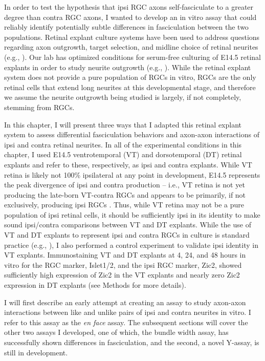 In order to test the hypothesis that ipsi RGC axons self-fasciculate to a greater degree than contra RGC axons, I wanted to develop an in vitro assay that could reliably identify potentially subtle differences in fasciculation between the two populations.
Retinal explant culture systems have been used to address questions regarding axon outgrowth, target selection, and midline choice of retinal neurites (e.g., ).
Our lab has optimized conditions for serum-free culturing of E14.5 retinal explants in order to study neurite outgrowth (e.g., ).
While the retinal explant system does not provide a pure population of RGCs in vitro, RGCs are the only retinal cells that extend long neurites at this developmental stage, and therefore we assume the neurite outgrowth being studied is largely, if not completely, stemming from RGCs.

In this chapter, I will present three ways that I adapted this retinal explant system to assess differential fasciculation behaviors and axon-axon interactions of ipsi and contra retinal neurites.
In all of the experimental conditions in this chapter, I used E14.5 ventrotemporal (VT) and dorsotemporal (DT) retinal explants and refer to these, respectively, as ipsi and contra explants.
While VT retina is likely not 100\% ipsilateral at any point in development, E14.5 represents the peak divergence of ipsi and contra production -- i.e., VT retina is not yet producing the late-born VT-contra RGCs and appears to be primarily, if not exclusively, producing ipsi RGCs \cite{drager1985birth}.
Thus, while VT retina may not be a pure population of ipsi retinal cells, it should be sufficiently ipsi in its identity to make sound ipsi/contra comparisons between VT and DT explants.
While the use of VT and DT explants to represent ipsi and contra RGCs in culture is standard practice (e.g., ), I also performed a control experiment to validate ipsi identity in VT explants.
Immunostaining VT and DT explants at 4, 24, and 48 hours in vitro for the RGC marker, Islet1/2, and the ipsi RGC marker, Zic2, showed sufficiently high expression of Zic2 in the VT explants and nearly zero Zic2 expression in DT explants (see Methods for more details).

I will first describe an early attempt at creating an assay to study axon-axon interactions between like and unlike pairs of ipsi and contra neurites in vitro.
I refer to this assay as the \emph{en face} assay.
The subsequent sections will cover the other two assays I developed, one of which, the bundle width assay, has successfully shown differences in fasciculation, and the second, a novel Y-assay, is still in development.